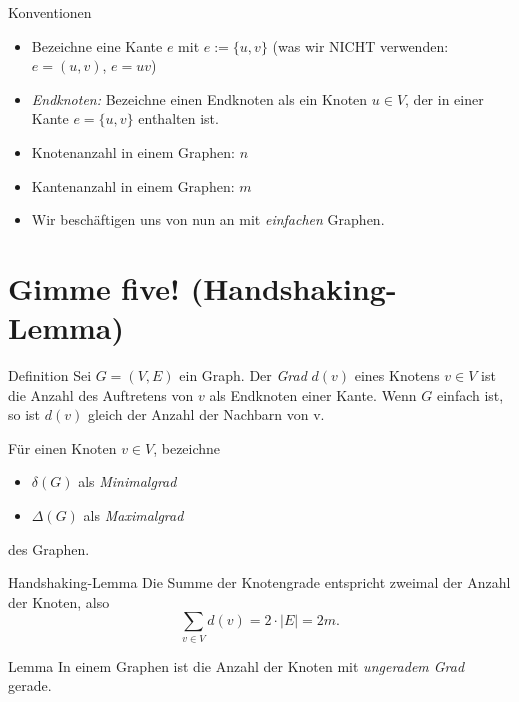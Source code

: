 \documentclass{beamer}
\begin{document}
\begin{frame}{Konventionen}
	\begin{itemize}
		\item Bezeichne eine Kante $e$ mit $e:= \{u, v\}$ (was wir NICHT verwenden: $e = (u, v)$, $e = uv$)
		\item \emph{Endknoten:} Bezeichne einen Endknoten als ein Knoten $u \in V$, der in einer Kante $e = \{u, v\}$ enthalten ist. %
		\item Knotenanzahl in einem Graphen: $n$
		\item Kantenanzahl in einem Graphen: $m$
		\item Wir beschäftigen uns von nun an mit \emph{einfachen} Graphen.
	\end{itemize}

\end{frame}

\section[Gimme five!]{Gimme five! (Handshaking-Lemma)}

\begin{frame}{\secname}
	\begin{block}{Definition}
		Sei $G = (V, E)$ ein Graph. Der \emph{Grad} $d(v)$ eines Knotens $v \in V$ ist die Anzahl des Auftretens von $v$ als Endknoten einer Kante. Wenn $G$ einfach ist, so ist $d(v)$ gleich der Anzahl der Nachbarn von v.
		\par\bigskip
		Für einen Knoten $v \in V$, bezeichne
		\begin{itemize}
			\item $\delta(G)$ als \emph{Minimalgrad}
			\item $\Delta(G)$ als \emph{Maximalgrad}
		\end{itemize}
		des Graphen.
	\end{block}
\end{frame}

\begin{frame}
	\begin{exampleblock}{Handshaking-Lemma}
		Die Summe der Knotengrade entspricht zweimal der Anzahl der Knoten, also
		\begin{equation*}
			\sum_{v \in V}d(v) = 2 \cdot |E| = 2m.
		\end{equation*}
	\end{exampleblock}
\end{frame}

\begin{frame}
	\begin{exampleblock}{Lemma}
		In einem Graphen ist die Anzahl der Knoten mit \emph{ungeradem Grad} gerade.
	\end{exampleblock}
\end{frame}
\end{document}
